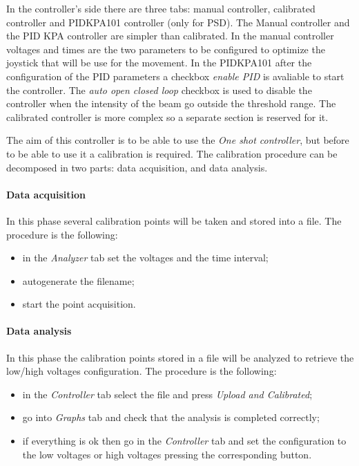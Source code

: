In the controller's side there are three tabs: manual controller, calibrated
controller and PIDKPA101 controller (only for PSD).
The Manual controller and the PID KPA controller are simpler than calibrated.
In the manual controller voltages and times are the two parameters to be configured to optimize the joystick that will be use for the movement.
In the PIDKPA101 after the configuration of the PID parameters a checkbox \emph{enable PID}
is avaliable to start the controller. The \emph{auto open closed loop} checkbox is used to
disable the controller when the intensity of the beam go outside the
threshold range.
The calibrated controller is more complex so a separate section is reserved for it.



The aim of this controller is to be able to use the \emph{One shot controller}, but before to be able to use it a calibration is required. The calibration procedure can be decomposed in two parts:
data acquisition, and data analysis.

\paragraph{Data acquisition}

In this phase several calibration points will be taken and stored into a file. The procedure
is the following:

\begin{itemize}
      \itemsep1pt\parskip0pt
      \item
            in the \emph{Analyzer} tab set the voltages and the time interval;
      \item
            autogenerate the filename;
      \item
            start the point acquisition.
\end{itemize}

\paragraph{Data analysis}

In this phase the calibration points stored in a
file will be analyzed to retrieve the low/high voltages configuration. The procedure is the following:

\begin{itemize}
      \itemsep1pt\parskip0pt
      \item
            in the \emph{Controller} tab select the file and press \emph{Upload
                  and Calibrated};
      \item
            go into \emph{Graphs} tab and check that the analysis is completed
            correctly;
      \item
            if everything is ok then go in the \emph{Controller} tab and set the
            configuration to the low voltages or high voltages pressing the
            corresponding button.
\end{itemize}

